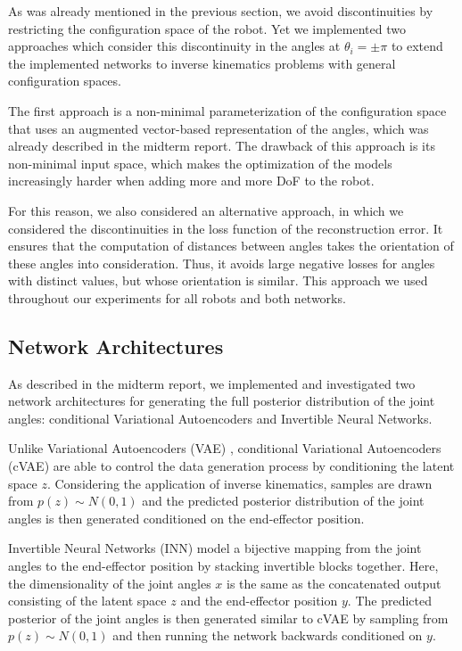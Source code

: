 \documentclass[conference]{IEEEtran}
\begin{document}
As was already mentioned in the previous section, we avoid discontinuities by restricting the configuration space of the robot. Yet we implemented two approaches which consider this discontinuity in the angles at $\theta_i = \pm \pi$ to extend the implemented networks to inverse kinematics problems with general configuration spaces.

The first approach is a non-minimal parameterization of the configuration space that uses an augmented vector-based representation of the angles, which was already described in the midterm report. The drawback of this approach is its non-minimal input space, which makes the optimization of the models increasingly harder when adding more and more DoF to the robot.

For this reason, we also considered an alternative approach, in which we considered the discontinuities in the loss function of the reconstruction error. It ensures that the computation of distances between angles takes the orientation of these angles into consideration. Thus, it avoids large negative losses for angles with distinct values, but whose orientation is similar. This approach we used throughout our experiments for all robots and both networks.

\subsection*{Network Architectures}

As described in the midterm report, we implemented and investigated two network architectures for generating the full posterior distribution of the joint angles: conditional Variational Autoencoders and Invertible Neural Networks. 

Unlike Variational Autoencoders (VAE) \cite{Kingma2014}, conditional Variational Autoencoders (cVAE) \cite{Sohn2015} are able to control the data generation process by conditioning the latent space $z$. Considering the application of inverse kinematics, samples are drawn from $p(z) \sim N(0, 1)$ and the predicted posterior distribution of the joint angles is then generated conditioned on the end-effector position.

Invertible Neural Networks (INN) \cite{Ardizzone2018} model a bijective mapping from the joint angles to the end-effector position by stacking invertible blocks together. Here, the dimensionality of the joint angles $x$ is the same as the concatenated output consisting of the latent space $z$ and the end-effector position $y$. The predicted posterior of the joint angles is then generated similar to cVAE by sampling from $p(z) \sim N(0, 1)$ and then running the network backwards conditioned on $y$.
\end{document}
